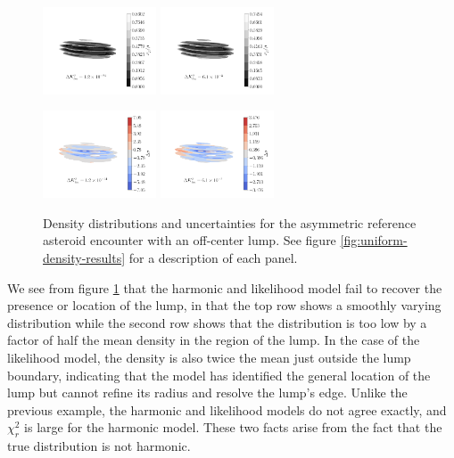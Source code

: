 \documentclass[fleqn,usenatbib]{mnras}
\begin{document}
\begin{figure}
  \includegraphics[width=0.3\textwidth]{figs/blob-unc-likelihood.pdf}\hfill
  \includegraphics[width=0.3\textwidth]{figs/blob-unc-harmonic.pdf}\hfill\hspace{0.3\textwidth}

  \includegraphics[width=0.3\textwidth]{figs/blob-rat-likelihood.pdf}\hfill
  \includegraphics[width=0.3\textwidth]{figs/blob-rat-harmonic.pdf}\hfill\hspace{0.3\textwidth}

  \caption{Density distributions and uncertainties for the asymmetric reference asteroid encounter with an off-center lump. See figure \ref{fig:uniform-density-results} for a description of each panel.}
  \label{fig:blob-density}
\end{figure}

We see from figure \ref{fig:blob-density} that the harmonic and likelihood model fail to recover the presence or location of the lump, in that the top row shows a smoothly varying distribution while the second row shows that the distribution is too low by a factor of half the mean density in the region of the lump. In the case of the likelihood model, the density is also twice the mean just outside the lump boundary, indicating that the model has identified the general location of the lump but cannot refine its radius and resolve the lump's edge. Unlike the previous example, the harmonic and likelihood models do not agree exactly, and $\chi^2_r$ is large for the harmonic model. These two facts arise from the fact that the true distribution is not harmonic.
\end{document}
